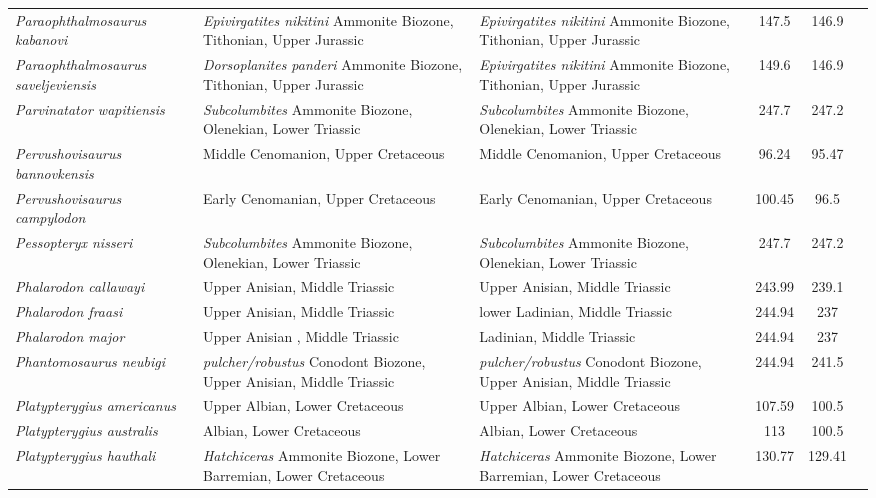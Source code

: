 \begin{longtabu}{>{\itshape}lXXSSl}
	Paraophthalmosaurus kabanovi & \emph{Epivirgatites nikitini} Ammonite Biozone, Tithonian, Upper Jurassic & \emph{Epivirgatites nikitini} Ammonite Biozone, Tithonian, Upper Jurassic & 147.5 & 146.9 & \cite{Efimov1999a} \\
	Paraophthalmosaurus saveljeviensis & \emph{Dorsoplanites panderi} Ammonite Biozone, Tithonian, Upper Jurassic & \emph{Epivirgatites nikitini} Ammonite Biozone, Tithonian, Upper Jurassic & 149.6 & 146.9 & \cite{Arkhangelsky1997} \\
	Parvinatator wapitiensis & \emph{Subcolumbites} Ammonite Biozone, Olenekian, Lower Triassic & \emph{Subcolumbites} Ammonite Biozone, Olenekian, Lower Triassic & 247.7 & 247.2 & \cite{Nicholls1995} \\
	Pervushovisaurus bannovkensis & Middle Cenomanion, Upper Cretaceous & Middle Cenomanion, Upper Cretaceous & 96.24 & 95.47 & \cite{Fischer2014b} \\
	Pervushovisaurus campylodon & Early Cenomanian, Upper Cretaceous & Early Cenomanian, Upper Cretaceous & 100.45 & 96.5 & \cite{Fischer2016} \\
	Pessopteryx nisseri & \emph{Subcolumbites} Ammonite Biozone, Olenekian, Lower Triassic & \emph{Subcolumbites} Ammonite Biozone, Olenekian, Lower Triassic & 247.7 & 247.2 & \cite{Wiman1910} \\
	Phalarodon callawayi & Upper Anisian, Middle Triassic & Upper Anisian, Middle Triassic & 243.99 & 239.1 & \cite{Schmitz2004} \\
	Phalarodon fraasi & Upper Anisian, Middle Triassic & lower Ladinian, Middle Triassic & 244.94 & 237 & \cite{Merriam1910} \\
	Phalarodon major & Upper Anisian , Middle Triassic & Ladinian, Middle Triassic & 244.94 & 237 & \cite{Maisch2005} \\
	Phantomosaurus neubigi & \emph{pulcher/robustus} Conodont Biozone, Upper Anisian, Middle Triassic & \emph{pulcher/robustus} Conodont Biozone, Upper Anisian, Middle Triassic & 244.94 & 241.5 & \cite{Sander1997} \\
	Platypterygius americanus & Upper Albian, Lower Cretaceous & Upper Albian, Lower Cretaceous & 107.59 & 100.5 & \cite{Romer1968} \\
	Platypterygius australis & Albian, Lower Cretaceous & Albian, Lower Cretaceous & 113 & 100.5 & \cite{Wade1984,Wade1990} \\
	Platypterygius hauthali & \emph{Hatchiceras} Ammonite Biozone, Lower Barremian, Lower Cretaceous & \emph{Hatchiceras} Ammonite Biozone, Lower Barremian, Lower Cretaceous & 130.77 & 129.41 & \cite{Fernandez2005} \\

\end{longtabu}
